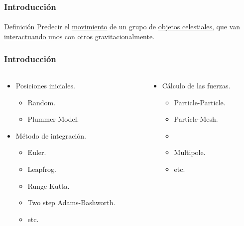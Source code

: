 \frame
{
\frametitle{Introducción}
\framesubtitle{}
\begin{block}{Definición}
    Predecir el \underline{movimiento} de un grupo de \underline{objetos celestiales},
    que van \underline{interactuando} unos con otros gravitacionalmente.
\end{block}
}

\frame
{
\frametitle{Introducción}
\framesubtitle{}
\begin{columns}
    \begin{column}{0.5\textwidth}
        \begin{itemize}
            \item Posiciones iniciales.
            \begin{itemize}
                \item Random.
                \item Plummer Model.
            \end{itemize}
            \item Método de integración.
            \begin{itemize}
                \item Euler.
                \item Leapfrog.
                \item Runge Kutta.
                \item Two step Adams-Bashworth.
                \item etc.
            \end{itemize}
        \end{itemize}
    \end{column}
    \begin{column}{0.5\textwidth}
        \begin{itemize}
            \item Cálculo de las fuerzas.
            \begin{itemize}
                \item Particle-Particle. 
                \item Particle-Mesh.  
                \item {} 
                \item Multipole. 
                \item etc.
            \end{itemize}
        \end{itemize}
    \end{column}
\end{columns}
}

